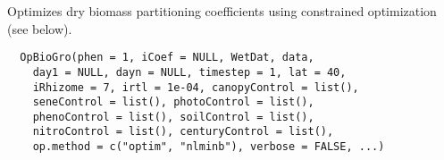 \documentclass[letterpaper]{book}
\begin{document}
%
\begin{Description}\relax
Optimizes dry biomass partitioning coefficients using
constrained optimization (see below).
\end{Description}
%
\begin{Usage}
\begin{verbatim}
  OpBioGro(phen = 1, iCoef = NULL, WetDat, data,
    day1 = NULL, dayn = NULL, timestep = 1, lat = 40,
    iRhizome = 7, irtl = 1e-04, canopyControl = list(),
    seneControl = list(), photoControl = list(),
    phenoControl = list(), soilControl = list(),
    nitroControl = list(), centuryControl = list(),
    op.method = c("optim", "nlminb"), verbose = FALSE, ...)
\end{verbatim}
\end{Usage}
%
\end{document}
